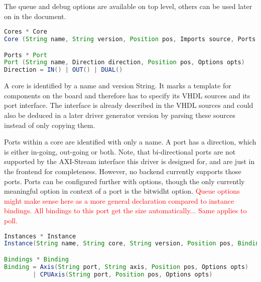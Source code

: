 \documentclass{report}
\begin{document}
The queue and debug options are available on top level, others can be used later on in the document.

\begin{lstlisting}[language=java, breaklines=true]
Cores * Core
Core (String name, String version, Position pos, Imports source, Ports ports)

Ports * Port
Port (String name, Direction direction, Position pos, Options opts)
Direction = IN() | OUT() | DUAL()
\end{lstlisting}

A core is identified by a name and version String. It marks a template for components on the board and therefore has to specify its VHDL sources and its port interface. The interface is already described in the VHDL sources and could also be deduced in a later driver generator version by parsing these sources instead of only copying them.

Ports within a core are identified with only a name. A port has a direction, which is either in-going, out-going or both. Note, that bi-directional ports are not supported by the AXI-Stream interface this driver is designed for, and are just in the frontend for completeness. However, no backend currently supports those ports.
Ports can be configured further with options, though the only currently meaningful option in context of a port is the bitwidht option. \textcolor{red}{Queue options might make sense here as a more general declaration compared to instance bindings. All bindings to this port get the size automatically... Same applies to poll. }

\begin{lstlisting}[language=java, breaklines=true]
Instances * Instance
Instance(String name, String core, String version, Position pos, Bindings bind)

Bindings * Binding
Binding = Axis(String port, String axis, Position pos, Options opts)
        | CPUAxis(String port, Position pos, Options opts)
\end{lstlisting}
\end{document}
